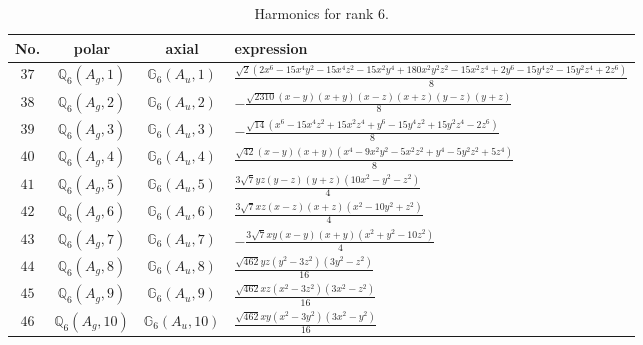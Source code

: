 \documentclass[fleqn,8pt,landscape]{jsarticle}
\begin{document}
\begin{table}[ht!]
\begin{center}
\caption{Harmonics for rank 6.}
\renewcommand{\arraystretch}{1.3}
\begin{tabular}{cccl} \hline \hline
No. & polar & axial & expression \\ \hline
$ 37 $ & $ \mathbb{Q}_{6}(A_{g},1) $ & $ \mathbb{G}_{6}(A_{u},1) $ & $ \frac{\sqrt{2} \left(2 x^{6} - 15 x^{4} y^{2} - 15 x^{4} z^{2} - 15 x^{2} y^{4} + 180 x^{2} y^{2} z^{2} - 15 x^{2} z^{4} + 2 y^{6} - 15 y^{4} z^{2} - 15 y^{2} z^{4} + 2 z^{6}\right)}{8} $ \\
$ 38 $ & $ \mathbb{Q}_{6}(A_{g},2) $ & $ \mathbb{G}_{6}(A_{u},2) $ & $ - \frac{\sqrt{2310} \left(x - y\right) \left(x + y\right) \left(x - z\right) \left(x + z\right) \left(y - z\right) \left(y + z\right)}{8} $ \\
$ 39 $ & $ \mathbb{Q}_{6}(A_{g},3) $ & $ \mathbb{G}_{6}(A_{u},3) $ & $ - \frac{\sqrt{14} \left(x^{6} - 15 x^{4} z^{2} + 15 x^{2} z^{4} + y^{6} - 15 y^{4} z^{2} + 15 y^{2} z^{4} - 2 z^{6}\right)}{8} $ \\
$ 40 $ & $ \mathbb{Q}_{6}(A_{g},4) $ & $ \mathbb{G}_{6}(A_{u},4) $ & $ \frac{\sqrt{42} \left(x - y\right) \left(x + y\right) \left(x^{4} - 9 x^{2} y^{2} - 5 x^{2} z^{2} + y^{4} - 5 y^{2} z^{2} + 5 z^{4}\right)}{8} $ \\
$ 41 $ & $ \mathbb{Q}_{6}(A_{g},5) $ & $ \mathbb{G}_{6}(A_{u},5) $ & $ \frac{3 \sqrt{7} y z \left(y - z\right) \left(y + z\right) \left(10 x^{2} - y^{2} - z^{2}\right)}{4} $ \\
$ 42 $ & $ \mathbb{Q}_{6}(A_{g},6) $ & $ \mathbb{G}_{6}(A_{u},6) $ & $ \frac{3 \sqrt{7} x z \left(x - z\right) \left(x + z\right) \left(x^{2} - 10 y^{2} + z^{2}\right)}{4} $ \\
$ 43 $ & $ \mathbb{Q}_{6}(A_{g},7) $ & $ \mathbb{G}_{6}(A_{u},7) $ & $ - \frac{3 \sqrt{7} x y \left(x - y\right) \left(x + y\right) \left(x^{2} + y^{2} - 10 z^{2}\right)}{4} $ \\
$ 44 $ & $ \mathbb{Q}_{6}(A_{g},8) $ & $ \mathbb{G}_{6}(A_{u},8) $ & $ \frac{\sqrt{462} y z \left(y^{2} - 3 z^{2}\right) \left(3 y^{2} - z^{2}\right)}{16} $ \\
$ 45 $ & $ \mathbb{Q}_{6}(A_{g},9) $ & $ \mathbb{G}_{6}(A_{u},9) $ & $ \frac{\sqrt{462} x z \left(x^{2} - 3 z^{2}\right) \left(3 x^{2} - z^{2}\right)}{16} $ \\
$ 46 $ & $ \mathbb{Q}_{6}(A_{g},10) $ & $ \mathbb{G}_{6}(A_{u},10) $ & $ \frac{\sqrt{462} x y \left(x^{2} - 3 y^{2}\right) \left(3 x^{2} - y^{2}\right)}{16} $ \\

\end{tabular}
\end{center}
\end{table}
\end{document}
